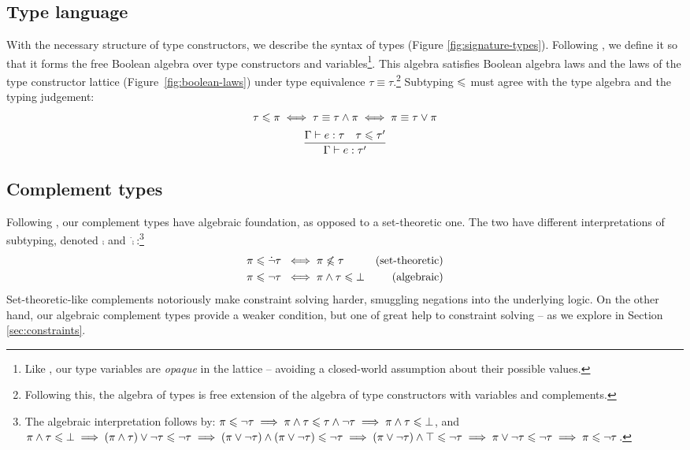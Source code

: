 \subsection{Type language}

With the necessary structure of type constructors, we describe the syntax of types (Figure \ref{fig:signature-types}). Following \textcite{mlstruct}, we define it so that it forms the free Boolean algebra over type constructors and variables\footnote{Like \textcite{dolan-thesis}, our type variables are \emph{opaque} in the lattice -- avoiding a closed-world assumption about their possible values.}. This algebra satisfies Boolean algebra laws and the laws of the type constructor lattice (Figure~\ref{fig:boolean-laws}) under type equivalence $\tau \equiv \tau$.\footnote{Following this, the algebra of types is free extension of the algebra of type constructors with variables and complements.} Subtyping $\leqslant$ must agree with the type algebra and the typing judgement:
$$ \begin{array}{c}
   \tau \leqslant \pi \iff \tau \equiv \tau \land \pi \iff \pi \equiv \tau \lor \pi \\[5pt]
   \dfrac{\Gamma \vdash e : \tau \quad \tau \leqslant \tau'}{\Gamma \vdash e : \tau'}
\end{array} $$

\subsection{Complement types} 
\label{subsec:oh-god-complements}
Following \textcite{mlstruct}, our complement types have algebraic foundation, as opposed to a set-theoretic one. The two have different interpretations of subtyping, denoted $\comp$ and $\dot \comp$:\footnote{The algebraic interpretation follows by: $\pi \leqslant \lnot \tau \implies \pi \land \tau \leqslant \tau \land \lnot \tau \implies \pi \land \tau \leqslant \bot$, and $\pi \land \tau \leqslant \bot \implies (\pi \land \tau) \lor \lnot \tau \leqslant \lnot \tau \implies (\pi \lor \lnot \tau) \land (\pi \lor \lnot \tau) \leqslant \lnot \tau \implies (\pi \lor \lnot \tau) \land \top \leqslant \lnot \tau \implies \pi \lor \lnot \tau \leqslant \lnot \tau \implies \pi \leqslant \lnot \tau$.}
\begin{align*}
    \pi \leqslant \dot {\lnot} \tau \;&\iff \pi \not\leqslant \tau & \text{(set-theoretic)} \\
    \pi \leqslant \lnot \tau \;&\iff \pi \land \tau \leqslant \bot & \text{(algebraic)} 
\end{align*}
Set-theoretic-like complements notoriously make constraint solving harder, smuggling negations into the underlying logic. On the other hand, our algebraic complement types provide a weaker condition, but one of great help to constraint solving -- as we explore in Section \ref{sec:constraints}.

